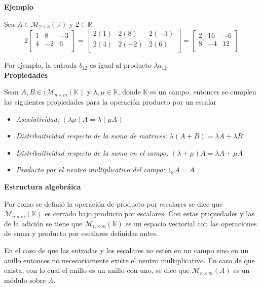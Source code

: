 \documentclass[10pt]{article}
\begin{document}
\noindent\textbf{Ejemplo} 

Sea $A \in \mathcal{M}_{2\times {3}}(\mathbb{R})$ y $2 \in \mathbb{R}$
$$
2
\begin{bmatrix}
1 & 8 & -3 \\
4 & -2 & 6 \\
\end{bmatrix}
=
\begin{bmatrix}
2(1) & 2(8) & 2(-3) \\
2(4) & 2(-2) & 2(6) \\
\end{bmatrix}
=
\begin{bmatrix}
2 & 16 & -6 \\
8 & -4 & 12 \\
\end{bmatrix}
$$

Por ejemplo, la entrada $b_{12}$ es igual al producto $\lambda a_{12}$. \\

\noindent\textbf{Propiedades}


Sean $A,B \in (\mathcal{M}_{n\times {m}}(\mathbb{K})$ y $\lambda, \mu \in \mathbb{K}$, donde $\mathbb{K}$ es un campo, entonces se cumplen las siguientes propiedades para la operación producto por un escalar

\begin{itemize}
\item \textit{Asociatividad:} $(\lambda \mu)A = \lambda(\mu A)$
\item \textit{Distribuitividad respecto de la suma de matrices:} $\lambda(A+B) = \lambda A + \lambda B$
\item \textit{Distribuitividad respecto de la suma en el campo:} $(\lambda + \mu)A = \lambda A + \mu A$
\item \textit{Producto por el neutro multiplicativo del campo:} $1_{\mathbb{K}}A = A$
\end{itemize}

\noindent\textbf{Estructura algebráica}


Por como se definió la operación de producto por escalares se dice que $\mathcal{M}_{n\times {m}}(\mathbb{K})$ es cerrado bajo producto por escalares. Con estas propiedades y las de la adición se tiene que $\mathcal{M}_{n\times {m}}(\mathbb{K})$ es un espacio vectorial con las operaciones de suma y producto por escalares definidas antes.

En el caso de que las entradas y los escalares no estén en un campo sino en un anillo entonces no necesariamente existe el neutro multiplicativo. En caso de que exista, con lo cual el anillo es un anillo con uno, se dice que $\mathcal{M}_{n\times {m}}(A)$ es un módulo sobre $A$. \\
\end{document}

